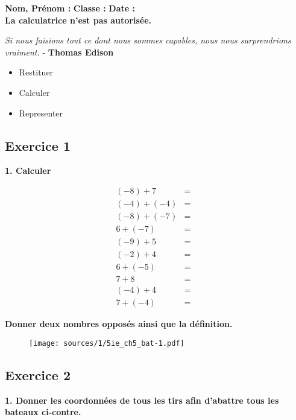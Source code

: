 \documentclass[10pt]{article}
\newcommand{\Pointille}[1][3]{\multido{}{#1}{ \makebox[\linewidth]{\dotfill}\\[\parskip]}}
\begin{document}

\textbf{Nom, Prénom :} \hspace{8cm} \textbf{Classe :} \hspace{3cm} \textbf{Date :}\\
\textbf{La calculatrice n'est pas autorisée.}

\begin{center}
  \textit{Si nous faisions tout ce dont nous sommes capables, nous nous surprendrions vraiment.}  - \textbf{Thomas Edison}
\end{center}


\begin{itemize}
\item Restituer
\item Calculer
\item Representer
\end{itemize}

\subsection*{Exercice 1} 

\textbf{1. Calculer}
\begin{multicols}{2}

  \begin{eqnarray*}
    (-8) + 7    &=& \\ 
    (-4) + (-4) &=& \\ 
    (-8) + (-7) &=& \\ 
    6 + (-7 )   &=& \\ 
    (-9) + 5    &=& \\ 
    (-2) + 4    &=& \\ 
    6 + (-5 )   &=& \\ 
    7 + 8       &=& \\ 
    (-4) + 4    &=& \\ 
    7 + (-4 )   &=& 
  \end{eqnarray*}
\end{multicols}
\textbf{Donner deux nombres opposés ainsi que la définition.}\\
\Pointille[3]


\begin{multicols}{2}
  \begin{figure}[H]
    \centering
    \texttt{[image: sources/1/5ie\_ch5\_bat-1.pdf]}
  \end{figure}
  \subsection*{Exercice 2}

  \textbf{1. Donner les coordonnées de tous les tirs afin d'abattre tous les bateaux ci-contre.}


\end{multicols}
\end{document}
